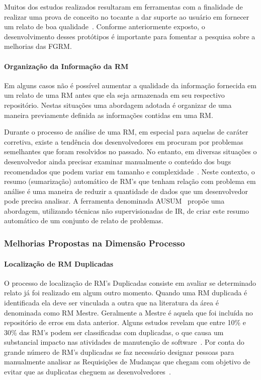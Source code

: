 Muitos dos estudos realizados resultaram em ferramentas com a finalidade de
realizar uma prova de conceito no tocante a dar suporte ao usuário em fornecer
um relato de boa qualidade~\cite{Tu:2014:MQI:2677832.2677844, Bettenburg2008a,
	Wu2011a,White:2015:GRR:2820282.2820291,moran2015auto}. Conforme
anteriormente exposto, o desenvolvimento desses protótipos é importante para
fomentar a pesquisa sobre a melhorias das FGRM\@.

\paragraph{Organização da Informação da RM}

Em alguns casos não é possível aumentar a qualidade da informação fornecida
em um relato de uma RM antes que ela seja armazenada em seu respectivo
repositório.  Nestas situações uma abordagem adotada é organizar de uma
maneira previamente definida as informações contidas em uma RM\@.

Durante o processo de análise de uma RM, em especial para aquelas de caráter
corretiva, existe a tendência dos desenvolvedores em procuram por problemas
semelhantes que foram resolvidos no passado. No entanto, em diversas situações o
desenvolvedor ainda precisar examinar manualmente o conteúdo dos bugs
recomendados que podem variar em tamanho e complexidade~\cite{mani2012ausum}.
Neste contexto, o resumo (sumarização) automático de RM's que tenham relação com
problema em análise é uma maneira de reduzir a quantidade de dados que um
desenvolvedor pode precisa analisar. A ferramenta denominada
AUSUM~\cite{mani2012ausum} propõe uma abordagem, utilizando técnicas não
supervisionadas de IR, de criar este resumo automático de um conjunto de relato
de problemas.

\subsubsection{Melhorias Propostas na Dimensão Processo}
\label{ssub:melhorias_dim_processo}

\paragraph{Localização de RM Duplicadas} O processo de localização de RM's
Duplicadas consiste em avaliar se determinado relato já foi realizado em algum
outro momento. Quando uma RM duplicada é identificada ela deve ser vinculada a
outra que na literatura da área é denominada como RM Mestre. Geralmente a Mestre
é aquela que foi incluída no repositório de erros em data anterior. Alguns
estudos revelam que entre 10\% e 30\% das RM's podem ser classificadas com
duplicadas, o que causa um substancial impacto nas atividades de manutenção de
software~\cite{anvik2005coping,cavalcanti2013bug,Runeson:2007:DDD:1248820.1248882}.
Por conta do grande número de RM's duplicadas se faz necessário designar pessoas
para manualmente analisar as Requisições de Mudanças que chegam com objetivo de
evitar que as duplicatas cheguem as desenvolvedores~\cite{anvik2005coping}.

